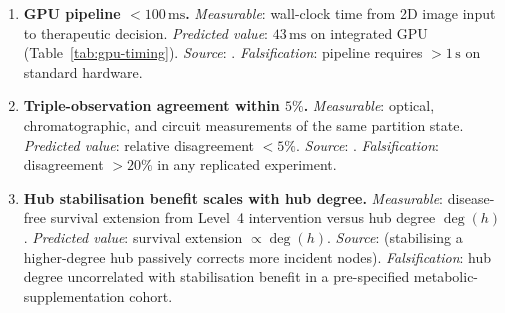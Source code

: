\begin{enumerate}[label=\textbf{M\arabic*.}, leftmargin=3em]
\item \textbf{GPU pipeline $< 100\,\mathrm{ms}$.}
  \emph{Measurable}: wall-clock time from 2D image input to therapeutic decision.
  \emph{Predicted value}: $43\,\mathrm{ms}$ on integrated GPU (Table~\ref{tab:gpu-timing}).
  \emph{Source}: .
  \emph{Falsification}: pipeline requires $> 1\,\mathrm{s}$ on standard hardware.

\item \textbf{Triple-observation agreement within $5\%$.}
  \emph{Measurable}: optical, chromatographic, and circuit measurements of the
    same partition state.
  \emph{Predicted value}: relative disagreement $< 5\%$.
  \emph{Source}: .
  \emph{Falsification}: disagreement $> 20\%$ in any replicated experiment.

\item \textbf{Hub stabilisation benefit scales with hub degree.}
  \emph{Measurable}: disease-free survival extension from Level~4 intervention
    versus hub degree $\deg(h)$.
  \emph{Predicted value}: survival extension $\propto \deg(h)$.
  \emph{Source}:  (stabilising a higher-degree hub passively
    corrects more incident nodes).
  \emph{Falsification}: hub degree uncorrelated with stabilisation benefit in
    a pre-specified metabolic-supplementation cohort.

\end{enumerate}
